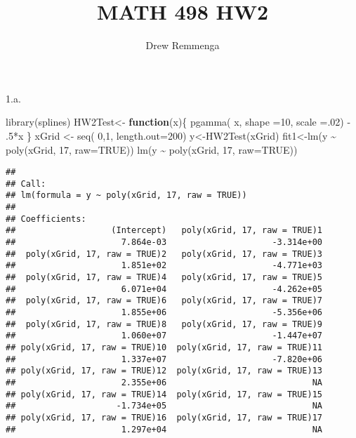 \documentclass[
]{article}
\title{MATH 498 HW2}
\author{Drew Remmenga}
\date{}
\newenvironment{Shaded}{\begin{snugshade}}{\end{snugshade}}
\newcommand{\AttributeTok}[1]{\textcolor[rgb]{0.77,0.63,0.00}{#1}}
\newcommand{\ConstantTok}[1]{\textcolor[rgb]{0.00,0.00,0.00}{#1}}
\newcommand{\ControlFlowTok}[1]{\textcolor[rgb]{0.13,0.29,0.53}{\textbf{#1}}}
\newcommand{\DecValTok}[1]{\textcolor[rgb]{0.00,0.00,0.81}{#1}}
\newcommand{\FunctionTok}[1]{\textcolor[rgb]{0.00,0.00,0.00}{#1}}
\newcommand{\NormalTok}[1]{#1}
\newcommand{\OtherTok}[1]{\textcolor[rgb]{0.56,0.35,0.01}{#1}}
\newcommand{\SpecialCharTok}[1]{\textcolor[rgb]{0.00,0.00,0.00}{#1}}
\begin{document}
\maketitle

1.a.

\begin{Shaded}
\begin{Highlighting}[]
\FunctionTok{library}\NormalTok{(splines)}
\NormalTok{HW2Test}\OtherTok{\textless{}{-}} \ControlFlowTok{function}\NormalTok{(x)\{}
\FunctionTok{pgamma}\NormalTok{( x, }\AttributeTok{shape =}\DecValTok{10}\NormalTok{, }\AttributeTok{scale =}\NormalTok{.}\DecValTok{02}\NormalTok{) }\SpecialCharTok{{-}}\NormalTok{ .}\DecValTok{5}\SpecialCharTok{*}\NormalTok{x}
\NormalTok{\}}
\NormalTok{xGrid }\OtherTok{\textless{}{-}} \FunctionTok{seq}\NormalTok{( }\DecValTok{0}\NormalTok{,}\DecValTok{1}\NormalTok{, }\AttributeTok{length.out=}\DecValTok{200}\NormalTok{)}
\NormalTok{y}\OtherTok{\textless{}{-}}\FunctionTok{HW2Test}\NormalTok{(xGrid)}
\NormalTok{fit1}\OtherTok{\textless{}{-}}\FunctionTok{lm}\NormalTok{(y }\SpecialCharTok{\textasciitilde{}} \FunctionTok{poly}\NormalTok{(xGrid, }\DecValTok{17}\NormalTok{, }\AttributeTok{raw=}\ConstantTok{TRUE}\NormalTok{))}
\FunctionTok{lm}\NormalTok{(y }\SpecialCharTok{\textasciitilde{}} \FunctionTok{poly}\NormalTok{(xGrid, }\DecValTok{17}\NormalTok{, }\AttributeTok{raw=}\ConstantTok{TRUE}\NormalTok{))}
\end{Highlighting}
\end{Shaded}

\begin{verbatim}
## 
## Call:
## lm(formula = y ~ poly(xGrid, 17, raw = TRUE))
## 
## Coefficients:
##                   (Intercept)   poly(xGrid, 17, raw = TRUE)1  
##                     7.864e-03                     -3.314e+00  
##  poly(xGrid, 17, raw = TRUE)2   poly(xGrid, 17, raw = TRUE)3  
##                     1.851e+02                     -4.771e+03  
##  poly(xGrid, 17, raw = TRUE)4   poly(xGrid, 17, raw = TRUE)5  
##                     6.071e+04                     -4.262e+05  
##  poly(xGrid, 17, raw = TRUE)6   poly(xGrid, 17, raw = TRUE)7  
##                     1.855e+06                     -5.356e+06  
##  poly(xGrid, 17, raw = TRUE)8   poly(xGrid, 17, raw = TRUE)9  
##                     1.060e+07                     -1.447e+07  
## poly(xGrid, 17, raw = TRUE)10  poly(xGrid, 17, raw = TRUE)11  
##                     1.337e+07                     -7.820e+06  
## poly(xGrid, 17, raw = TRUE)12  poly(xGrid, 17, raw = TRUE)13  
##                     2.355e+06                             NA  
## poly(xGrid, 17, raw = TRUE)14  poly(xGrid, 17, raw = TRUE)15  
##                    -1.734e+05                             NA  
## poly(xGrid, 17, raw = TRUE)16  poly(xGrid, 17, raw = TRUE)17  
##                     1.297e+04                             NA
\end{verbatim}
\end{document}
